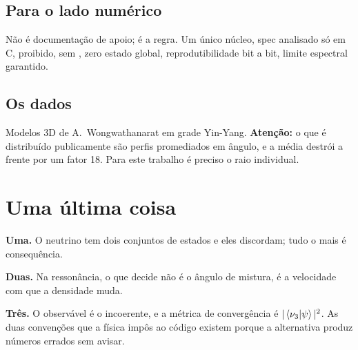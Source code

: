\subsection{Para o lado numérico}

\begin{description}[leftmargin=0pt, itemsep=0.7ex]
\item[\cmd{CONVENTIONS.md}, no próprio repositório.] Não é documentação de
  apoio; é a regra. Um único núcleo, spec analisado só em C,
   proibido, sem , zero estado global,
  reprodutibilidade bit a bit, limite espectral garantido.
\end{description}

\subsection{Os dados}

\begin{description}[leftmargin=0pt, itemsep=0.7ex]
\item[Garching Core-Collapse Supernova Archive.] Modelos 3D de
  A.~Wongwathanarat em grade Yin-Yang. \textbf{Atenção:} o que é distribuído
  publicamente são perfis promediados em ângulo, e a média destrói a frente por
  um fator 18. Para este trabalho é preciso o raio individual.
\end{description}

\section{Uma última coisa}

\begin{conceito}
\textbf{Uma.} O neutrino tem dois conjuntos de estados e eles discordam; tudo o
mais é consequência.

\smallskip
\textbf{Duas.} Na ressonância, o que decide não é o ângulo de mistura, é a
velocidade com que a densidade muda.

\smallskip
\textbf{Três.} O observável é o incoerente, e a métrica de convergência é
$|\left\langle\nu_3\middle|\psi\right\rangle|^2$. As duas convenções que a física impôs ao código
existem porque a alternativa produz números errados sem avisar.
\end{conceito}
